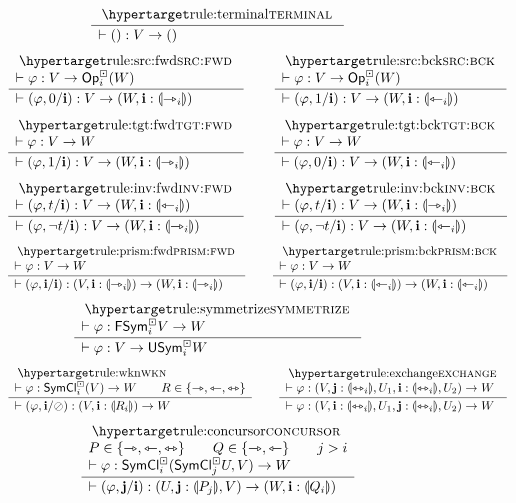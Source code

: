 \documentclass[a4paper]{memoir}
\begin{document}
\begin{figure}
	\[
		\inferencel{terminal}{
		}{
			\sez () : V \to ()
		}{}
	\]
	\[
		\inferencel{src:fwd}{
			\sez \vfi : V \to \Opcube_i(W)
		}{
			\sez (\vfi, 0/\dm i) : V \to (W, \dm i : \rival{\jet_i})
		}{}
		\qquad
		\inferencel{src:bck}{
			\sez \vfi : V \to \Opcube_i(W)
		}{
			\sez (\vfi, 1/\dm i) : V \to (W, \dm i : \rival{\tej_i})
		}{}
	\]
	\[
		\inferencel{tgt:fwd}{
			\sez \vfi : V \to W
		}{
			\sez (\vfi, 1/\dm i) : V \to (W, \dm i : \rival{\jet_i})
		}{}
		\qquad
		\inferencel{tgt:bck}{
			\sez \vfi : V \to W
		}{
			\sez (\vfi, 0/\dm i) : V \to (W, \dm i : \rival{\tej_i})
		}{}
	\]
	\[
		\inferencel{inv:fwd}{
			\sez (\vfi, t/\dm i) : V \to (W, \dm i : \rival{\tej_i})
		}{
			\sez (\vfi, \lnot t/\dm i) : V \to (W, \dm i : \rival{\jet_i})
		}{}
		\qquad
		\inferencel{inv:bck}{
			\sez (\vfi, t/\dm i) : V \to (W, \dm i : \rival{\jet_i})
		}{
			\sez (\vfi, \lnot t/\dm i) : V \to (W, \dm i : \rival{\tej_i})
		}{}
	\]
	\[
		\inferencel{prism:fwd}{
			\sez \vfi : V \to W
		}{
			\sez (\vfi, \dm i / \dm i) : (V, \dm i : \rival{\jet_i}) \to (W, \dm i : \rival{\jet_i})
		}{}
		\qquad
		\inferencel{prism:bck}{
			\sez \vfi : V \to W
		}{
			\sez (\vfi, \dm i / \dm i) : (V, \dm i : \rival{\tej_i}) \to (W, \dm i : \rival{\tej_i})
		}{}
	\]
	\[
		\inferencel{symmetrize}{
			\sez \vfi : \Fsymcube_i V \to W
		}{
			\sez \vfi : V \to \Usymcube_i W
		}{}
	\]
	\[
		\inferencel{wkn}{
			\sez \vfi : \UFsymcube_i(V) \to W \qquad
			R \in \accol{\jet, \tej, \equijet}
		}{
			\sez (\vfi, \dm i / \novar) : (V, \dm i : \rival{R_i}) \to W
		}{}
		\qquad
		\inferencel{exchange}{
			\sez \vfi : (V, \dm j : \rival{\equijet_i}, U_1, \dm i : \rival{\equijet_i}, U_2) \to W
		}{
			\sez \vfi : (V, \dm i : \rival{\equijet_i}, U_1, \dm j : \rival{\equijet_i}, U_2) \to W
		}{}
	\]
	\[
		\inferencel{concursor}{
			P \in \accol{\jet, \tej, \equijet}
			\qquad
			Q \in \accol{\jet, \tej}
			\qquad
			j > i
			\\
			\sez \vfi : \UFsymcube_i(\UFsymcube_j U, V) \to W
		}{
			\sez (\vfi, \dm j / \dm i) : (U, \dm j : \rival{P_j}, V) \to (W, \dm i : \rival{Q_i})
		}{}
\]
\end{figure}
\end{document}
